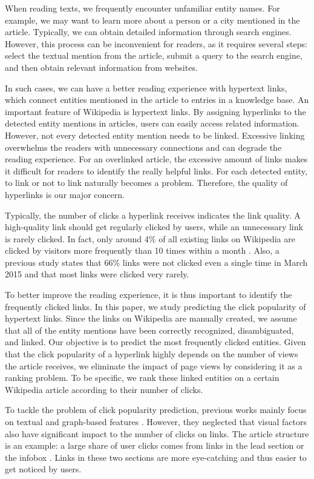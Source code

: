 When reading texts, we frequently encounter unfamiliar entity names. For example, we may want to learn more about a person or a city mentioned in the article. Typically, we can obtain detailed information through search engines. However, this process can be inconvenient for readers, as it requires several steps: select the textual mention from the article, submit a query to the search engine, and then obtain relevant information from websites.

In such cases, we can have a better reading experience with hypertext links, which connect entities mentioned in the article to entries in a knowledge base. An important feature of Wikipedia is hypertext links. By assigning hyperlinks to the detected entity mentions in articles, users can easily access related information. However, not every detected entity mention needs to be linked. Excessive linking overwhelms the readers with unnecessary connections and can degrade the reading experience. For an overlinked article, the excessive amount of links makes it difficult for readers to identify the really helpful links. For each detected entity, to link or not to link naturally becomes a problem. Therefore, the quality of hyperlinks is our major concern.

Typically, the number of clicks a hyperlink receives indicates the link quality. A high-quality link should get regularly clicked by users, while an unnecessary link is rarely clicked. 
In fact, only around 4\% of all existing links on Wikipedia are clicked by visitors more frequently than 10 times within a month \cite{dimitrov2017makes}. Also, a previous study \cite{paranjape2016improving} states that 66\% links were not clicked even a single time in March 2015 and that most links were clicked very rarely. 

To better improve the reading experience, it is thus important to identify the frequently clicked links. In this paper, we study predicting the click popularity of hypertext links. Since the links on Wikipedia are manually created, we assume that all of the entity mentions have been correctly recognized, disambiguated, and linked. Our objective is to predict the most frequently clicked entities. Given that the click popularity of a hyperlink highly depends on the number of views the article receives, we eliminate the impact of page views by considering it as a ranking problem. To be specific, we rank these linked entities on a certain Wikipedia article according to their number of clicks.

To tackle the problem of click popularity prediction, previous works mainly focus on textual and graph-based features \cite{thruesen2016link, dimitrov2017makes}. However, they neglected that visual factors also have significant impact to the number of clicks on links. The article structure is an example: a large share of user clicks comes from links in the lead section or the infobox \cite{lamprecht2017structure}. Links in these two sections are more eye-catching and thus easier to get noticed by users.

